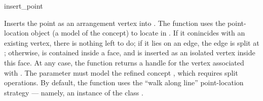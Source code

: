 \ccRefPageBegin

\begin{ccRefFunction}{insert_point}

\ccDefinition

Inserts the point  as an arrangement vertex into .
The function uses the point-location object  (a model of the
 concept) to locate  in .
If it conincides with an existing vertex, there is nothing left to
do; if it lies on an edge, the edge is split at ;
otherwise,  is contained inside a face, and is inserted as
an isolated vertex inside this face.
At any case, the function returns a handle for the vertex associated
with . The  parameter must model the refined concept
, which requires split operations.
By default, the function uses the ``walk along line'' point-location
strategy --- namely, an instance of the class
.



%

\end{ccRefFunction}

\ccRefPageEnd
